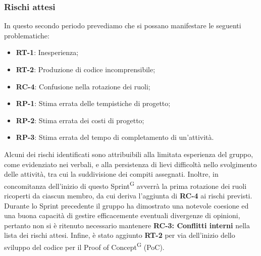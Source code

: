 \documentclass[8pt]{article}
\newcommand{\glossterm}[1]{#1\textsuperscript{G}} %
\begin{document}
\subsubsection{Rischi attesi}
In questo secondo periodo prevediamo che si possano manifestare le seguenti problematiche: 
\begin{itemize}
\setlength{\itemsep}{0em}
\item \textbf{RT-1}: Inesperienza;
\item \textbf{RT-2}: Produzione di codice incomprensibile;
\item \textbf{RC-4}: Confusione nella rotazione dei ruoli;
\item \textbf{RP-1}: Stima errata delle tempistiche di progetto;
\item \textbf{RP-2}: Stima errata dei costi di progetto;
\item \textbf{RP-3}: Stima errata del tempo di completamento di un'attività.
\end{itemize}
Alcuni dei rischi identificati sono attribuibili alla limitata esperienza del gruppo, come evidenziato nei verbali, e alla persistenza di lievi difficoltà nello svolgimento delle attività, tra cui la suddivisione dei compiti assegnati. Inoltre, in concomitanza dell'inizio di questo \glossterm{Sprint} avverrà la prima rotazione dei ruoli ricoperti da ciascun membro, da cui deriva l'aggiunta di \textbf{RC-4} ai rischi previsti. Durante lo Sprint precedente il gruppo ha dimostrato una notevole coesione ed una buona capacità di gestire efficacemente eventuali divergenze di opinioni, pertanto non si è ritenuto necessario mantenere \textbf{RC-3: Conflitti interni} nella lista dei rischi attesi. Infine, è stato aggiunto \textbf{RT-2} per via dell'inizio dello sviluppo del codice per il \glossterm{Proof of Concept} (PoC).
\clearpage
\end{document}
